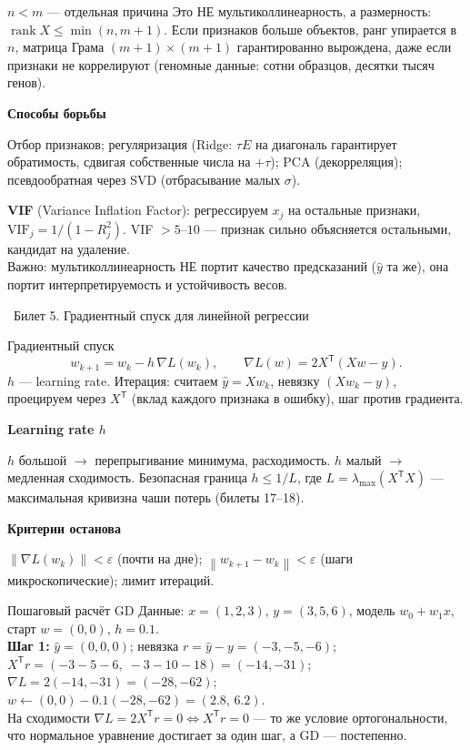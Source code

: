 \documentclass[12pt, a4paper]{article}
\newcommand{\bilet}[2]{%
  \vspace{10pt}%
  \noindent\colorbox{qcolor}{\parbox{\dimexpr\linewidth-2\fboxsep\relax}{%
    \color{white}\large\bfseries\strut\ Билет #1. #2%
  }}%
  \nopagebreak\vspace{5pt}\par\nopagebreak%
}
\newcommand{\qsub}[1]{%
  \vspace{5pt}%
  {\bfseries\color{defblue} #1}%
  \par\vspace{2pt}%
}
\newcommand{\rank}{\operatorname{rank}}
\newcommand{\tr}{^{\mathsf{T}}}
\newcommand{\norm}[1]{\left\lVert #1 \right\rVert}
\newcommand{\wh}[1]{\widehat{#1}}
\begin{document}
\begin{rembox}{$n<m$ --- отдельная причина}
Это НЕ мультиколлинеарность, а размерность: $\rank X \le \min(n, m{+}1)$. Если признаков больше объектов, ранг упирается в $n$, матрица Грама $(m{+}1)\times(m{+}1)$ гарантированно вырождена, даже если признаки не коррелируют (геномные данные: сотни образцов, десятки тысяч генов).
\end{rembox}

\qsub{Способы борьбы}
Отбор признаков; регуляризация (Ridge: $\tau E$ на диагональ гарантирует обратимость, сдвигая собственные числа на $+\tau$); PCA (декорреляция); псевдообратная через SVD (отбрасывание малых $\sigma$).

\begin{fishkabox}
\textbf{VIF} (Variance Inflation Factor): регрессируем $x_j$ на остальные признаки, $\text{VIF}_j = 1/(1 - R_j^2)$. VIF $> 5$--$10$ --- признак сильно объясняется остальными, кандидат на удаление.\\
Важно: мультиколлинеарность НЕ портит качество предсказаний ($\wh y$ та же), она портит интерпретируемость и устойчивость весов.
\end{fishkabox}

\bilet{5}{Градиентный спуск для линейной регрессии}

\begin{defbox}{Градиентный спуск}
\[
  w_{k+1} = w_k - h\,\nabla L(w_k), \qquad \nabla L(w) = 2 X\tr(Xw - y).
\]
$h$ --- learning rate. Итерация: считаем $\wh y = Xw_k$, невязку $(Xw_k - y)$, проецируем через $X\tr$ (вклад каждого признака в ошибку), шаг против градиента.
\end{defbox}

\qsub{Learning rate $h$}
$h$ большой $\to$ перепрыгивание минимума, расходимость. $h$ малый $\to$ медленная сходимость. Безопасная граница $h \le 1/L$, где $L = \lambda_{\max}(X\tr X)$ --- максимальная кривизна чаши потерь (билеты 17--18).

\qsub{Критерии останова}
$\norm{\nabla L(w_k)} < \varepsilon$ (почти на дне); $\norm{w_{k+1} - w_k} < \varepsilon$ (шаги микроскопические); лимит итераций.

\begin{exbox}{Пошаговый расчёт GD}
Данные: $x = (1,2,3)$, $y = (3,5,6)$, модель $w_0 + w_1 x$, старт $w = (0,0)$, $h = 0.1$.\\
\textbf{Шаг 1:} $\wh y = (0,0,0)$; невязка $r = \wh y - y = (-3,-5,-6)$;
$X\tr r = (-3{-}5{-}6,\; -3{-}10{-}18) = (-14, -31)$;
$\nabla L = 2(-14,-31) = (-28,-62)$;
$w \leftarrow (0,0) - 0.1(-28,-62) = (2.8,\, 6.2)$.\\
На сходимости $\nabla L = 2X\tr r = 0 \Leftrightarrow X\tr r = 0$ --- то же условие ортогональности, что нормальное уравнение достигает за один шаг, а GD --- постепенно.
\end{exbox}
\end{document}
